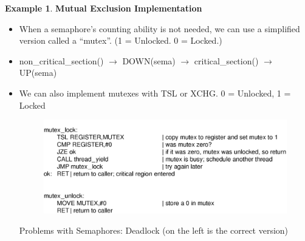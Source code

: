 \documentclass[11pt,a4paper]{article}
\theoremstyle{definition}
\newtheorem{example}{Example}[section]
\newenvironment{myitemize}
{ \begin{itemize}
    \setlength{\itemsep}{5pt}
    \setlength{\parskip}{0pt}
    \setlength{\parsep}{0pt}     }
{ \end{itemize}                  }
\begin{document}
\begin{example}{\textbf{Mutual Exclusion Implementation}}
\begin{myitemize}
\begin{myitemize}
\begin{myitemize}
				\item UP, POST, GIVE or V: If there are any processes blocking on a DOWN, one is selected and woken up. Otherwise UP increments the semaphore and returns.
			\end{myitemize}
			\item When a semaphore’s counting ability is not needed, we can use a simplified version called a “mutex”. (1 = Unlocked. 0 = Locked.)
			\item non\_critical\_section() $\rightarrow$ DOWN(sema) $\rightarrow$ critical\_section() $\rightarrow$ UP(sema)
			\item We can also implement mutexes with \textsf{TSL} or \textsf{XCHG}. 0 = Unlocked, 1 = Locked
			\begin{figure}[!h]
				\includegraphics[scale=0.35]{m1/mutexWithTSL}
				\centering
			\end{figure}
			\begin{tcolorbox}
				\textsf{Problems with Semaphores: Deadlock} (on the left is the correct version)
				

\end{tcolorbox}
\end{myitemize}
\end{myitemize}
\end{example}
\end{document}
